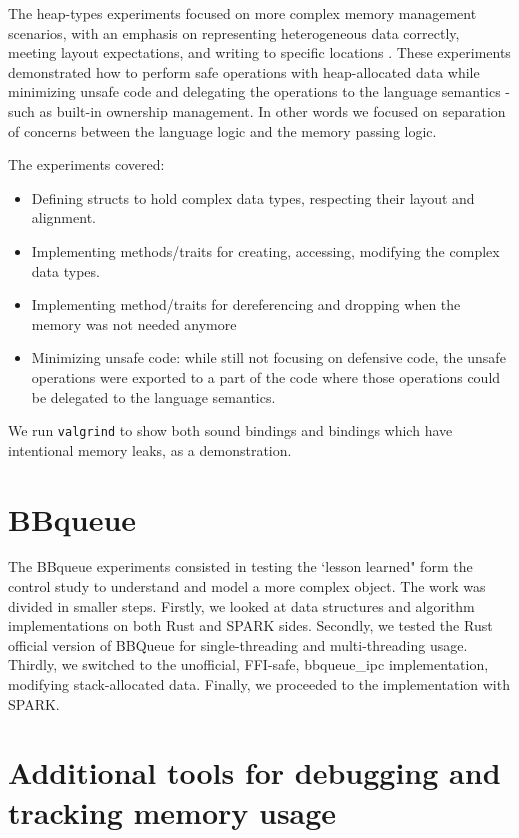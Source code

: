\documentclass[nomenclature, english, bibtex]{kththesis}
\begin{document}
The heap-types experiments focused on more complex memory management scenarios, with an emphasis on representing heterogeneous data correctly, meeting layout expectations, and writing to specific locations
. These experiments demonstrated how to perform safe operations with heap-allocated data while minimizing unsafe code and delegating the operations to the language semantics - such as built-in ownership management. In other words we focused on separation of concerns between the language logic and the memory passing logic.

The experiments covered:

\begin{itemize}
    \item Defining structs to hold complex data types, respecting their layout and alignment.
    \item Implementing methods/traits for creating, accessing, modifying the complex data types.
    \item Implementing method/traits for dereferencing and dropping when the memory was not needed anymore
    \item Minimizing unsafe code: while still not focusing on defensive code, the unsafe operations were exported to a part of the code where those operations could be delegated to the language semantics.   
\end{itemize}


We run \texttt{valgrind} to show both sound bindings and bindings which have intentional memory leaks, as a demonstration.


\section{BBqueue}

The BBqueue experiments consisted in testing the `lesson learned" form the control study to understand and model a more complex object. The work was divided in smaller steps. Firstly, we looked at data structures and algorithm implementations on both Rust and SPARK sides. Secondly, we tested the Rust official version of BBQueue for single-threading and multi-threading usage. Thirdly, we switched to the unofficial, FFI-safe, bbqueue\_ipc implementation, modifying stack-allocated data. 
Finally, we proceeded to the  implementation with SPARK.


\section{Additional tools for debugging and tracking memory usage}
\end{document}
